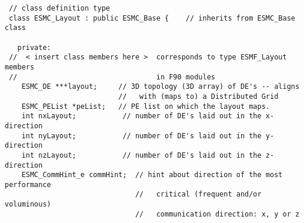 
\begin{verbatim}
 // class definition type
 class ESMC_Layout : public ESMC_Base {    // inherits from ESMC_Base class

   private:
 //  < insert class members here >  corresponds to type ESMF_Layout members
 //                                 in F90 modules
    ESMC_DE ***layout;     // 3D topology (3D array) of DE's -- aligns
                           //   with (maps to) a Distributed Grid
    ESMC_PEList *peList;   // PE list on which the layout maps.
    int nxLayout;           // number of DE's laid out in the x-direction
    int nyLayout;           // number of DE's laid out in the y-direction
    int nzLayout;           // number of DE's laid out in the z-direction
    ESMC_CommHint_e commHint;  // hint about direction of the most performance
                               //   critical (frequent and/or voluminous)
                               //   communication direction: x, y or z
\end{verbatim}
